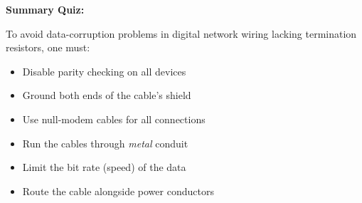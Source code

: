 \vfil \eject

\noindent
{\bf Summary Quiz:}

To avoid data-corruption problems in digital network wiring lacking termination resistors, one must:

\begin{itemize}
\item{} Disable parity checking on all devices
\vskip 5pt 
\item{} Ground both ends of the cable's shield
\vskip 5pt 
\item{} Use null-modem cables for all connections
\vskip 5pt 
\item{} Run the cables through {\it metal} conduit
\vskip 5pt 
\item{} Limit the bit rate (speed) of the data
\vskip 5pt 
\item{} Route the cable alongside power conductors
\end{itemize}




